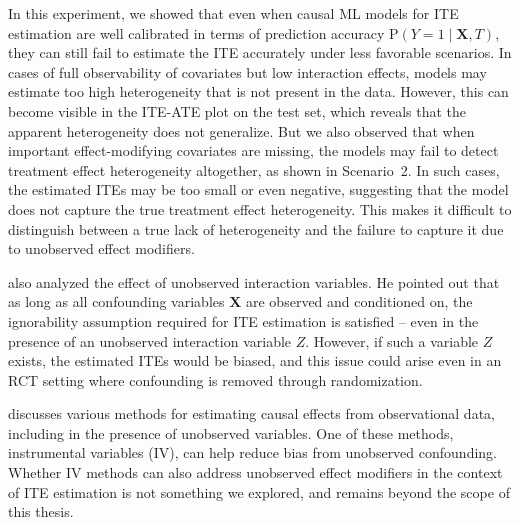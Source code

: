 \medskip

In this experiment, we showed that even when causal ML models for ITE estimation are well calibrated in terms of prediction accuracy $\text{P}(Y = 1 \mid \mathbf{X}, T)$, they can still fail to estimate the ITE accurately under less favorable scenarios. In cases of full observability of covariates but low interaction effects, models may estimate too high heterogeneity that is not present in the data. However, this can become visible in the ITE-ATE plot on the test set, which reveals that the apparent heterogeneity does not generalize. 
But we also observed that when important effect-modifying covariates are missing, the models may fail to detect treatment effect heterogeneity altogether, as shown in Scenario~2. In such cases, the estimated ITEs may be too small or even negative, suggesting that the model does not capture the true treatment effect heterogeneity. This makes it difficult to distinguish between a true lack of heterogeneity and the failure to capture it due to unobserved effect modifiers.


\citet{vegetabile2021} also analyzed the effect of unobserved interaction variables. He pointed out that as long as all confounding variables $\mathbf{X}$ are observed and conditioned on, the ignorability assumption required for ITE estimation is satisfied -- even in the presence of an unobserved interaction variable $Z$. However, if such a variable $Z$ exists, the estimated ITEs would be biased, and this issue could arise even in an RCT setting where confounding is removed through randomization.

\citet{nichols2007} discusses various methods for estimating causal effects from observational data, including in the presence of unobserved variables. One of these methods, instrumental variables (IV), can help reduce bias from unobserved confounding. Whether IV methods can also address unobserved effect modifiers in the context of ITE estimation is not something we explored, and remains beyond the scope of this thesis.










